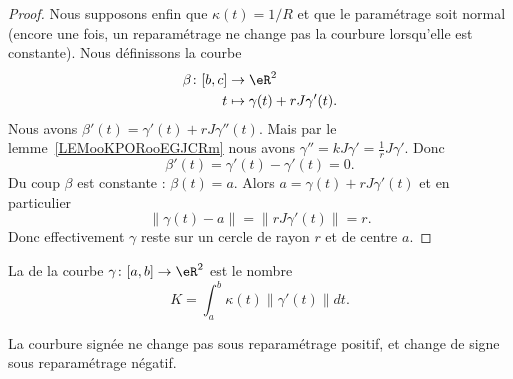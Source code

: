 \begin{proof}
	Nous supposons enfin que \( \kappa(t)=1/R\) et que le paramétrage soit normal (encore une fois, un reparamétrage ne change pas la courbure lorsqu'elle est constante). Nous définissons la courbe
	\begin{equation}
		\begin{aligned}
			\beta\colon \mathopen[ b , c \mathclose] & \to \eR^2                       \\
			t                                        & \mapsto \gamma(t)+rJ\gamma'(t).
		\end{aligned}
	\end{equation}
	Nous avons \( \beta'(t)=\gamma'(t)+rJ\gamma''(t)\). Mais par le lemme~\ref{LEMooKPORooEGJCRm} nous avons \( \gamma''=kJ\gamma'=\frac{1}{ r }J\gamma'\). Donc
	\begin{equation}
		\beta'(t)=\gamma'(t)-\gamma'(t)=0.
	\end{equation}
	Du coup \( \beta\) est constante : \( \beta(t)=a\). Alors \( a=\gamma(t)+rJ\gamma'(t)\) et en particulier
	\begin{equation}
		\| \gamma(t)-a \|=\| rJ\gamma'(t) \|=r.
	\end{equation}
	Donc effectivement \( \gamma\) reste sur un cercle de rayon \( r\) et de centre \( a\).
\end{proof}

\begin{definition}
	La  de la courbe \( \gamma\colon \mathopen[ a , b \mathclose] \to \eR^2 \) est le nombre
	\begin{equation}        \label{EQooTIFWooQflOfd}
		K=\int_a^b\kappa(t)\| \gamma'(t) \|dt.
	\end{equation}
\end{definition}

\begin{lemma}
	La courbure signée ne change pas sous reparamétrage positif, et change de signe sous reparamétrage négatif.
\end{lemma}

